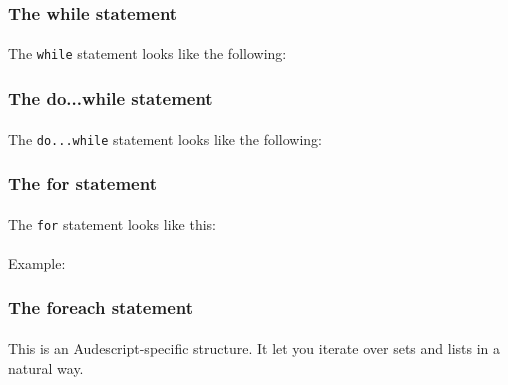 \documentclass{article}
\begin{document}
\begin{sloppypar}
\subsubsection{ The while statement}


\paragraph{}
The \verb!while! statement looks like the following:
         {}
      
      
      

\subsubsection{ The do...while statement}


\paragraph{}
The \verb!do...while! statement looks like the following:
         {}
      
      
      

\subsubsection{ The for statement}


\paragraph{}
The \verb!for! statement looks like this:
         {}
         
         
\paragraph{}
Example:
         {}
      
      
      

\subsubsection{ The foreach statement}


\paragraph{}
This is an Audescript-specific structure. It let you iterate over sets and lists in a natural way.


\end{sloppypar}
\end{document}
